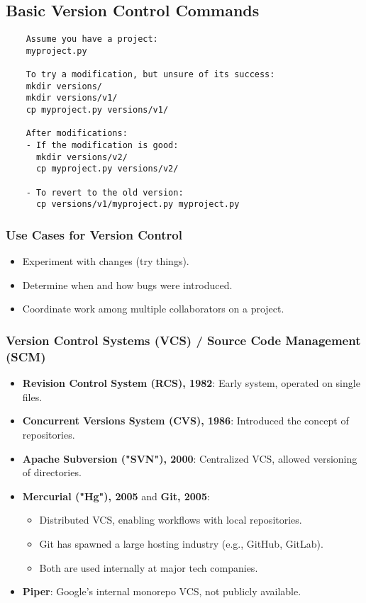 \documentclass[12pt]{article}
\begin{document}
\subsection{Basic Version Control Commands}
\begin{verbatim}
    Assume you have a project:
    myproject.py
    
    To try a modification, but unsure of its success:
    mkdir versions/
    mkdir versions/v1/
    cp myproject.py versions/v1/
    
    After modifications:
    - If the modification is good:
      mkdir versions/v2/
      cp myproject.py versions/v2/
    
    - To revert to the old version:
      cp versions/v1/myproject.py myproject.py
\end{verbatim}

\subsubsection{Use Cases for Version Control}
\begin{itemize}
    \item Experiment with changes (try things).
    \item Determine when and how bugs were introduced.
    \item Coordinate work among multiple collaborators on a project.
\end{itemize}

\subsubsection{Version Control Systems (VCS) / Source Code Management (SCM)}
\begin{itemize}
    \item \textbf{Revision Control System (RCS), 1982}: Early system, operated on single files.
    \item \textbf{Concurrent Versions System (CVS), 1986}: Introduced the concept of repositories.
    \item \textbf{Apache Subversion ("SVN"), 2000}: Centralized VCS, allowed versioning of directories.
    \item \textbf{Mercurial ("Hg"), 2005} and \textbf{Git, 2005}:
    \begin{itemize}
        \item Distributed VCS, enabling workflows with local repositories.
        \item Git has spawned a large hosting industry (e.g., GitHub, GitLab).
        \item Both are used internally at major tech companies.
    \end{itemize}
    \item \textbf{Piper}: Google's internal monorepo VCS, not publicly available.
\end{itemize}
\end{document}
